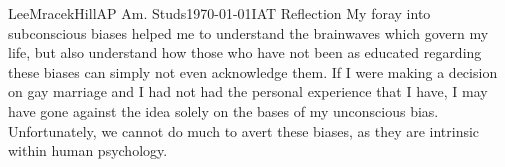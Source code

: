 \documentclass[a4paper, 11pt]{article}
\begin{document}
\begin{mla}{Lee}{Mracek}{Hill}{AP Am. Studs}{\today}{IAT Reflection}
    My foray into subconscious biases helped me to understand the brainwaves which govern my life, but also understand how those who have not been as educated regarding these biases can simply not even acknowledge them. If I were making a decision on gay marriage and I had not had the personal experience that I have, I may have gone against the idea solely on the bases of my unconscious bias. Unfortunately, we cannot do much to avert these biases, as they are intrinsic within human psychology.
\end{mla}
\end{document}
